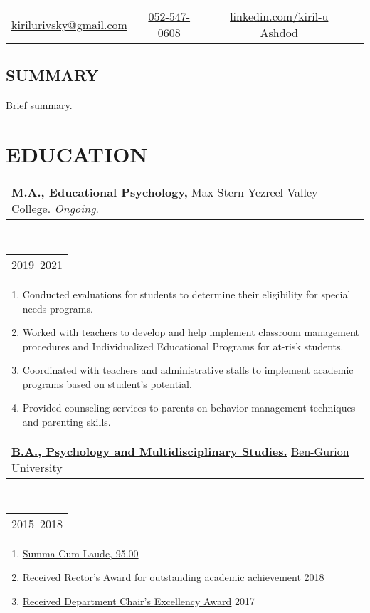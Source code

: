 \documentclass[11pt,a4paper,roman]{moderncv}      %
\makeatletter
\newcommand*{\customcventry}[7][.25em]{
	\begin{tabular}{@{}l} %
		{\bfseries #4} #3
	\end{tabular}
	\hfill%
	\begin{tabular}{l@{}}
	\end{tabular}
	\hfill
	\begin{tabular}{@{}l} %
		#7
	\end{tabular}
	\hfill%
	\begin{tabular}{l@{}} %
		 #2
	\end{tabular}
	\par\addvspace{#1}
}
\makeatother
\begin{document}
\makecvtitle
\vspace*{-15mm}

\begin{center}
	\begin{tabular}{ c c c c }
		\faEnvelopeO\enspace \href{mailto:kirilurivsky@gmail.com}{kirilurivsky@gmail.com} &	\faMobile\enspace \href{tel:972525470608}{052-547-0608}
		 & \faLinkedinSquare\enspace \href{https://www.linkedin.com/in/kiril-u}{linkedin.com/kiril-u}
		\faLocationArrow\enspace \href{https://goo.gl/maps/MSacjpSy7vZSKykP7}{Ashdod}
	\end{tabular}
\end{center}

\subsection{SUMMARY}{
	{Brief summary.}
}

\section{EDUCATION}

{\customcventry{2019--2021}{Max Stern Yezreel Valley College. \textit{Ongoing}.}{M.A., Educational Psychology,}{}{}{}	

\begin{enumerate}[leftmargin=0.75cm,label=\textcolor{cyan}{\textbullet}]
	\itemsep 0em 
	\item Conducted evaluations for students to determine their eligibility for special needs programs.
	\item Worked with teachers to develop and help implement classroom management procedures and Individualized Educational Programs for at-risk students. 
	\item Coordinated with teachers and administrative staffs to implement academic programs based on student’s potential.
	\item Provided counseling services to parents on behavior management techniques and parenting skills.
\end{enumerate}
}

{\customcventry{2015--2018}{\href{https://loona-il.000webhostapp.com/resume-references/BA-and-honorary.pdf}{Ben-Gurion University}}{\href{https://loona-il.000webhostapp.com/resume-references/BA-and-honorary.pdf}{B.A., Psychology and Multidisciplinary Studies.}}{Eilat}{}{}	

\begin{enumerate}[leftmargin=0.75cm,label=\textcolor{cyan}{\textbullet}]
	\itemsep 0em 
			\item \href{https://loona-il.000webhostapp.com/resume-references/BA-and-honorary.pdf}{Summa Cum Laude, 95.00}
			\item \href{https://loona-il.000webhostapp.com/resume-references/BA-and-honorary.pdf}{Received Rector's Award for outstanding academic achievement} \hfill 2018
			\item \href{https://loona-il.000webhostapp.com/resume-references/BA-and-honorary.pdf}{Received Department Chair’s Excellency Award} \hfill 2017
\end{enumerate}
}
\end{document}
